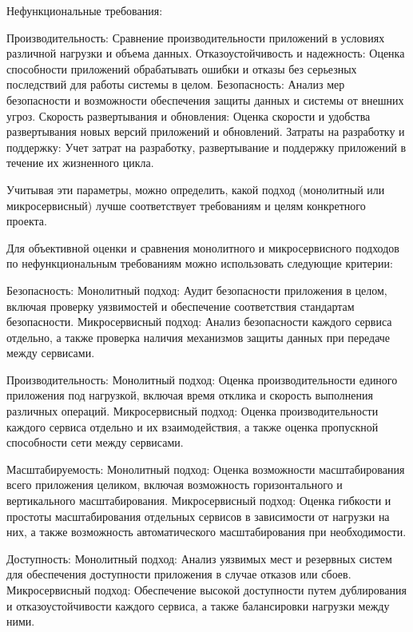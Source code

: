 Нефункциональные требования:

    Производительность: Сравнение производительности приложений в условиях различной нагрузки и объема данных.
    Отказоустойчивость и надежность: Оценка способности приложений обрабатывать ошибки и отказы без серьезных последствий для работы системы в целом.
    Безопасность: Анализ мер безопасности и возможности обеспечения защиты данных и системы от внешних угроз.
    Скорость развертывания и обновления: Оценка скорости и удобства развертывания новых версий приложений и обновлений.
    Затраты на разработку и поддержку: Учет затрат на разработку, развертывание и поддержку приложений в течение их жизненного цикла.

Учитывая эти параметры, можно определить, какой подход (монолитный или микросервисный) лучше соответствует требованиям и целям конкретного проекта.

Для объективной оценки и сравнения монолитного и микросервисного подходов по нефункциональным требованиям можно использовать следующие критерии:

    Безопасность:
        Монолитный подход: Аудит безопасности приложения в целом, включая проверку уязвимостей и обеспечение соответствия стандартам безопасности.
        Микросервисный подход: Анализ безопасности каждого сервиса отдельно, а также проверка наличия механизмов защиты данных при передаче между сервисами.

    Производительность:
        Монолитный подход: Оценка производительности единого приложения под нагрузкой, включая время отклика и скорость выполнения различных операций.
        Микросервисный подход: Оценка производительности каждого сервиса отдельно и их взаимодействия, а также оценка пропускной способности сети между сервисами.

    Масштабируемость:
        Монолитный подход: Оценка возможности масштабирования всего приложения целиком, включая возможность горизонтального и вертикального масштабирования.
        Микросервисный подход: Оценка гибкости и простоты масштабирования отдельных сервисов в зависимости от нагрузки на них, а также возможность автоматического масштабирования при необходимости.

    Доступность:
        Монолитный подход: Анализ уязвимых мест и резервных систем для обеспечения доступности приложения в случае отказов или сбоев.
        Микросервисный подход: Обеспечение высокой доступности путем дублирования и отказоустойчивости каждого сервиса, а также балансировки нагрузки между ними.

